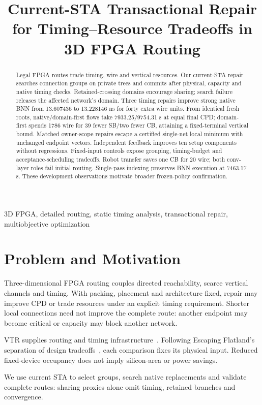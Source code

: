 \documentclass[conference,10pt]{IEEEtran}
\title{Current-STA Transactional Repair for Timing--Resource Tradeoffs in 3D FPGA Routing}
\author{\IEEEauthorblockN{Anonymous development manuscript}}
\begin{document}
\maketitle
\begin{abstract}
Legal FPGA routes trade timing, wire and vertical resources. Our current-STA repair searches connection groups on private trees and commits after physical, capacity and native timing checks. Retained-crossing domains encourage sharing; search failure releases the affected network's domain. Three timing repairs improve strong native BNN from 13.607436 to 13.228146 ns for forty extra wire units. From identical fresh roots, native/domain-first flows take 7933.25/9754.31 s at equal final CPD; domain-first spends 1786 wire for 39 fewer SB/two fewer CB, attaining a fixed-terminal vertical bound. Matched owner-scope repairs escape a certified single-net local minimum with unchanged endpoint vectors. Independent feedback improves ten setup components without regressions. Fixed-input controls expose grouping, timing-budget and acceptance-scheduling tradeoffs. Robot transfer saves one CB for 20 wire; both conv-layer roles fail initial routing. Single-pass indexing preserves BNN execution at 7463.17 s. These development observations motivate broader frozen-policy confirmation.
\end{abstract}
\begin{IEEEkeywords}
3D FPGA, detailed routing, static timing analysis, transactional repair, multiobjective optimization
\end{IEEEkeywords}

\section{Problem and Motivation}
Three-dimensional FPGA routing couples directed reachability, scarce vertical channels and timing. With packing, placement and architecture fixed, repair may improve CPD or trade resources under an explicit timing requirement. Shorter local connections need not improve the complete route: another endpoint may become critical or capacity may block another network.

VTR supplies routing and timing infrastructure~\cite{vtr9paper}. Following Escaping Flatland's separation of design tradeoffs~\cite{flatland}, each comparison fixes its physical input. Reduced fixed-device occupancy does not imply silicon-area or power savings.

We use current STA to select groups, search native replacements and validate complete routes: sharing proxies alone omit timing, retained branches and convergence. 
\end{document}
